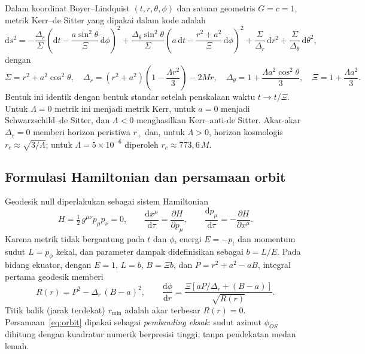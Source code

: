 \documentclass[11pt,a4paper]{article}
\newcommand{\dd}{\mathrm{d}}
\begin{document}
Dalam koordinat Boyer--Lindquist $(t, r, \theta, \phi)$ dan satuan geometris $G = c = 1$, metrik
Kerr--de Sitter yang dipakai dalam kode adalah
\begin{equation}
  \dd s^2 = -\frac{\Delta_r}{\Sigma}\left(\dd t - \frac{a\sin^2\theta}{\Xi}\,\dd\phi\right)^2
  + \frac{\Delta_\theta\sin^2\theta}{\Sigma}\left(a\,\dd t - \frac{r^2+a^2}{\Xi}\,\dd\phi\right)^2
  + \frac{\Sigma}{\Delta_r}\,\dd r^2 + \frac{\Sigma}{\Delta_\theta}\,\dd\theta^2,
  \label{eq:metrik}
\end{equation}
dengan
\begin{equation}
  \Sigma = r^2 + a^2\cos^2\theta,\quad
  \Delta_r = (r^2+a^2)\left(1 - \frac{\Lambda r^2}{3}\right) - 2Mr,\quad
  \Delta_\theta = 1 + \frac{\Lambda a^2\cos^2\theta}{3},\quad
  \Xi = 1 + \frac{\Lambda a^2}{3}.
\end{equation}
Bentuk ini identik dengan bentuk standar \citep{li2017entropy,hackmann2010geodesic} setelah penskalaan
waktu $t \to t/\Xi$. Untuk $\Lambda = 0$ metrik ini menjadi metrik Kerr, untuk $a = 0$ menjadi
Schwarzschild--de Sitter, dan $\Lambda < 0$ menghasilkan Kerr--anti-de Sitter. Akar-akar $\Delta_r = 0$
memberi horizon peristiwa $r_+$ dan, untuk $\Lambda > 0$, horizon kosmologis $r_c \approx \sqrt{3/\Lambda}$;
untuk $\Lambda = 5\times10^{-6}$ diperoleh $r_c \approx 773{,}6\,M$.

\subsection{Formulasi Hamiltonian dan persamaan orbit}

Geodesik null diperlakukan sebagai sistem Hamiltonian \citep{emam2021covariant,ritus2015lagrangian}
\begin{equation}
  H = \tfrac12\, g^{\mu\nu} p_\mu p_\nu = 0, \qquad
  \frac{\dd x^\mu}{\dd\tau} = \frac{\partial H}{\partial p_\mu}, \qquad
  \frac{\dd p_\mu}{\dd\tau} = -\frac{\partial H}{\partial x^\mu}.
  \label{eq:hamilton}
\end{equation}
Karena metrik tidak bergantung pada $t$ dan $\phi$, energi $E = -p_t$ dan momentum sudut $L = p_\phi$
kekal, dan parameter dampak didefinisikan sebagai $b = L/E$. Pada bidang ekuator, dengan $E = 1$,
$L = b$, $B = \Xi b$, dan $P = r^2 + a^2 - aB$, integral pertama geodesik memberi
\begin{equation}
  R(r) = P^2 - \Delta_r\,(B - a)^2, \qquad
  \frac{\dd\phi}{\dd r} = \frac{\Xi\left[a P/\Delta_r + (B - a)\right]}{\sqrt{R(r)}}.
  \label{eq:orbit}
\end{equation}
Titik balik (jarak terdekat) $r_\text{min}$ adalah akar terbesar $R(r) = 0$. Persamaan~\eqref{eq:orbit}
dipakai sebagai \emph{pembanding eksak}: sudut azimut $\phi_{OS}$ dihitung dengan kuadratur numerik
berpresisi tinggi, tanpa pendekatan medan lemah.
\end{document}
